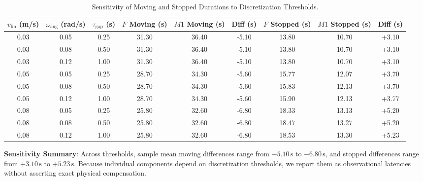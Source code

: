 \documentclass[10pt]{article}
\begin{document}
\begin{table}[h]
\centering
\footnotesize
\caption{Sensitivity of Moving and Stopped Durations to Discretization Thresholds.}
\label{tab:sensitivity}
\setlength{\tabcolsep}{4pt}
\begin{tabular}{ccccccccc}
\toprule
$v_{\text{lin}}$ (m/s) & $\omega_{\text{ang}}$ (rad/s) & $\tau_{\text{gap}}$ (s) & $F$ Moving (s) & $M1$ Moving (s) & Diff (s) & $F$ Stopped (s) & $M1$ Stopped (s) & Diff (s) \\
\midrule
0.03 & 0.05 & 0.25 & 31.30 & 36.40 & -5.10 & 13.80 & 10.70 & +3.10 \\
0.03 & 0.08 & 0.50 & 31.30 & 36.40 & -5.10 & 13.80 & 10.70 & +3.10 \\
0.03 & 0.12 & 1.00 & 31.30 & 36.40 & -5.10 & 13.80 & 10.70 & +3.10 \\
0.05 & 0.05 & 0.25 & 28.70 & 34.30 & -5.60 & 15.77 & 12.07 & +3.70 \\
0.05 & 0.08 & 0.50 & 28.70 & 34.30 & -5.60 & 15.83 & 12.13 & +3.70 \\
0.05 & 0.12 & 1.00 & 28.70 & 34.30 & -5.60 & 15.90 & 12.13 & +3.77 \\
0.08 & 0.05 & 0.25 & 25.80 & 32.60 & -6.80 & 18.33 & 13.13 & +5.20 \\
0.08 & 0.08 & 0.50 & 25.80 & 32.60 & -6.80 & 18.47 & 13.27 & +5.20 \\
0.08 & 0.12 & 1.00 & 25.80 & 32.60 & -6.80 & 18.53 & 13.30 & +5.23 \\
\bottomrule
\end{tabular}
\end{table}

\noindent\textbf{Sensitivity Summary}: Across thresholds, sample mean moving differences range from $-5.10\,\text{s}$ to $-6.80\,\text{s}$, and stopped differences range from $+3.10\,\text{s}$ to $+5.23\,\text{s}$. Because individual components depend on discretization thresholds, we report them as observational latencies without asserting exact physical compensation.
\end{document}
